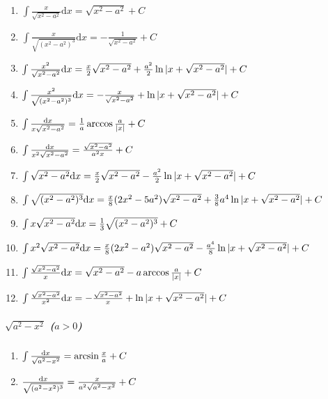 \begin{tiny}
\begin{enumerate}
\item $ \int \frac{x}{\sqrt{x^2-a^2}} \mathrm{d}x = \sqrt{x^2-a^2} + C $

\item $ \int \frac{x}{\sqrt{(x^2-a^2)^3}} \mathrm{d}x = -\frac{1}{\sqrt{x^2-a^2}} + C $

\item $ \int \frac{x^2}{\sqrt{x^2-a^2}} \mathrm{d} x = \frac{x}{2}\sqrt{x^2-a^2} + \frac{a^2}{2}\ln|x+\sqrt{x^2-a^2}| + C $

\item $ \int \frac{x^2}{\sqrt{(x^2-a^2)^3}} \mathrm{d} x = -\frac{x}{\sqrt{x^2-a^2}} + \ln|x+\sqrt{x^2-a^2}| + C $

\item $ \int \frac{\mathrm{d} x}{x\sqrt{x^2-a^2}} = \frac{1}{a} \arccos \frac{a}{|x|} + C $

\item $ \int \frac{\mathrm{d} x}{x^2\sqrt{x^2-a^2}} = \frac{\sqrt{x^2-a^2}}{a^2x} + C $

\item $ \int \sqrt{x^2-a^2} \mathrm{d} x = \frac{x}{2}\sqrt{x^2-a^2} - \frac{a^2}{2}\ln|x + \sqrt{x^2-a^2}| + C $

\item $ \int \sqrt{(x^2-a^2)^3} \mathrm{d} x = \frac{x}{8}(2x^2-5a^2)\sqrt{x^2-a^2} + \frac{3}{8}a^4\ln|x + \sqrt{x^2-a^2}| + C $

\item $ \int x \sqrt{x^2-a^2} \mathrm{d} x = \frac{1}{3} \sqrt{(x^2-a^2)^3} + C $

\item $ \int x^2\sqrt{x^2-a^2} \mathrm{d} x = \frac{x}{8}(2x^2-a^2)\sqrt{x^2-a^2} - \frac{a^4}{8}\ln|x+\sqrt{x^2-a^2}| + C $

\item $ \int \frac{\sqrt{x^2-a^2}}{x} \mathrm{d} x = \sqrt{x^2-a^2} - a \arccos\frac{a}{|x|} + C $

\item $ \int \frac{\sqrt{x^2-a^2}}{x^2} \mathrm{d} x = -\frac{\sqrt{x^2-a^2}}{x} + \ln|x + \sqrt{x^2-a^2}| + C $

\end{enumerate}

\subparagraph{$\sqrt{a^2-x^2}$ ($a>0$)}

\begin{enumerate}

\item $ \int \frac{\mathrm{d} x}{\sqrt{a^2-x^2}} = \arcsin \frac{x}{a} + C $

\item $ \frac{\mathrm{d} x}{\sqrt{(a^2-x^2)^3}} = \frac{x}{a^2\sqrt{a^2-x^2}} + C $


\end{enumerate}
\end{tiny}
